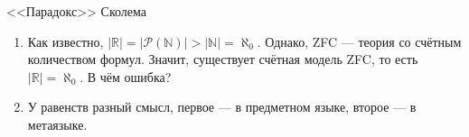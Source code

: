 \documentclass[aspectratio=169]{beamer}
\begin{document}
\begin{frame}{<<Парадокс>> Сколема}
\begin{enumerate}
\item Как известно, $|\mathbb{R}| = |\mathcal{P}(\mathbb{N})| > |\mathbb{N}| = \aleph_0$. \pause Однако, ZFC --- теория со счётным
количеством формул. \pause
Значит, существует счётная модель ZFC, то есть $|\mathbb{R}| = \aleph_0$. \pause В чём ошибка? \pause
\item У равенств разный смысл, первое --- в предметном языке, второе --- в метаязыке. 
\end{enumerate}
\end{frame}
\end{document}
